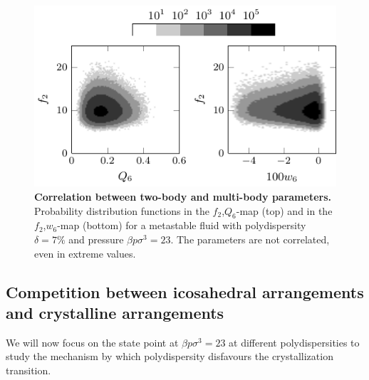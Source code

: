 \documentclass[twocolumn,superscriptaddress]{revtex4-1}
\begin{document}
\begin{figure}
 \centering
 \includegraphics{fig_f2decoupling}
 \caption{\textbf{Correlation between two-body and multi-body parameters.} Probability distribution functions in the $f_2$,$Q_6$-map (top) and in the $f_2$,$w_6$-map (bottom) for a metastable fluid with polydispersity $\delta=7\%$ and pressure $\beta p\sigma^3=23$. The parameters are not correlated, even in extreme values.}
 \label{fig:f2decoupling}
\end{figure}





\subsection{Competition between icosahedral arrangements and crystalline arrangements}

We will now focus on the state point at $\beta p\sigma^3=23$ at different polydispersities to
study the mechanism by which polydispersity disfavours the crystallization transition.
\end{document}
